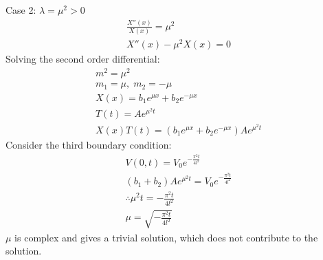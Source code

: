 \documentclass[11pt]{article}
\numberwithin{equation}{section}
\begin{document}
Case 2: $\lambda = \mu^2 > 0$
\begin{gather}
    \frac{X''(x)}{X(x)} = \mu^2\\
    X''(x) - \mu^2 X(x) = 0
\end{gather}
Solving the second order differential:
\begin{gather}
    m^2 = \mu^2\\
    m_1 = \mu, \; m_2 = - \mu\\
    X(x) = b_1 e^{\mu x } + b_2 e^{-\mu x}\\
    T(t) = Ae^{\mu^2 t}\\
    X(x)T(t) = \left(b_1 e^{\mu x } + b_2 e^{-\mu x}\right)Ae^{\mu^2 t}
\end{gather}
Consider the third boundary condition:
\begin{gather}
    V(0,t) = V_0 e^{-\frac{\pi^2 t}{4l^2}}\\
    \left(b_1 + b_2\right)Ae^{\mu^2 t} = V_0 e^{-\frac{\pi^2 t}{4l^2}}\\
    \therefore \mu^2 t = -\frac{\pi^2 t }{4l^2}\\
    \mu = \sqrt{-\frac{\pi^2 t }{4l^2}}
\end{gather}
$\mu$ is complex and gives a trivial solution, which does not contribute to the solution.
\end{document}
